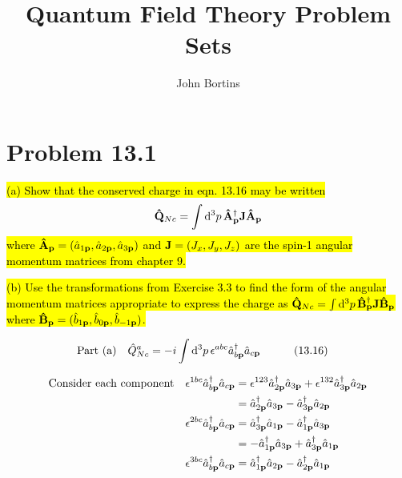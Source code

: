 \documentclass{article}
\title{Quantum Field Theory Problem Sets}
\author{John Bortins}
\begin{document}
\maketitle{}


\section*{Problem 13.1}
\begin{quoting}
  \hl{(a) Show that the conserved charge in eqn. 13.16 may be written}
  \[\vb{\hat{Q}}_{Nc}=\int\dd[3]{p}\vb{\hat{A}}^\dagger_{\vb{p}}\vb{J}\vb{\hat{A}}_{\vb{p}} \]
  \hl{where  $\vb{\hat{A}}_{\vb{p}}=(\hat{a}_{1\vb{p}},\hat{a}_{2\vb{p}},\hat{a}_{3\vb{p}})$ and  $\vb{J}=(J_x,J_y,J_z)$ are the spin-1 angular momentum matrices from chapter 9.}

  \hl{(b) Use the transformations from Exercise 3.3 to find the form of the angular momentum matrices appropriate to express the charge as  $\vb{\hat{Q}}_{Nc}=\int\dd[3]{p}\vb{\hat{B}}^\dagger_{\vb{p}}\vb{J}\vb{\hat{B}}_{\vb{p}}$ where $\vb{\hat{B}}_{\vb{p}}=(\hat{b}_{1\vb{p}},\hat{b}_{0\vb{p}},\hat{b}_{-1\vb{p}})$.}
\end{quoting}

\[\qq*{Part (a)}\hat{Q}^a_{Nc}                                                           =-i\int\dd[3]{p}\epsilon^{abc}\hat{a}^\dagger_{b\vb{p}}\hat{a}_{c\vb{p}}\qquad\qq{(13.16)}                         \]

\begin{align*}
  \qq*{Consider each component}\epsilon^{1bc}\hat{a}^\dagger_{b\vb{p}}\hat{a}_{c\vb{p}} & =\epsilon^{123}\hat{a}^\dagger_{2\vb{p}}\hat{a}_{3\vb{p}}+\epsilon^{132}\hat{a}^\dagger_{3\vb{p}}\hat{a}_{2\vb{p}} \\
                                                                                        & =\hat{a}^\dagger_{2\vb{p}}\hat{a}_{3\vb{p}}-\hat{a}^\dagger_{3\vb{p}}\hat{a}_{2\vb{p}}                             \\
  \epsilon^{2bc}\hat{a}^\dagger_{b\vb{p}}\hat{a}_{c\vb{p}}                              & =\hat{a}^\dagger_{3\vb{p}}\hat{a}_{1\vb{p}}-\hat{a}^\dagger_{1\vb{p}}\hat{a}_{3\vb{p}}                             \\
                                                                                        & =-\hat{a}^\dagger_{1\vb{p}}\hat{a}_{3\vb{p}}+\hat{a}^\dagger_{3\vb{p}}\hat{a}_{1\vb{p}}                            \\
  \epsilon^{3bc}\hat{a}^\dagger_{b\vb{p}}\hat{a}_{c\vb{p}}                              & =\hat{a}^\dagger_{1\vb{p}}\hat{a}_{2\vb{p}}-\hat{a}^\dagger_{2\vb{p}}\hat{a}_{1\vb{p}}                             \\
\end{align*}
\end{document}
